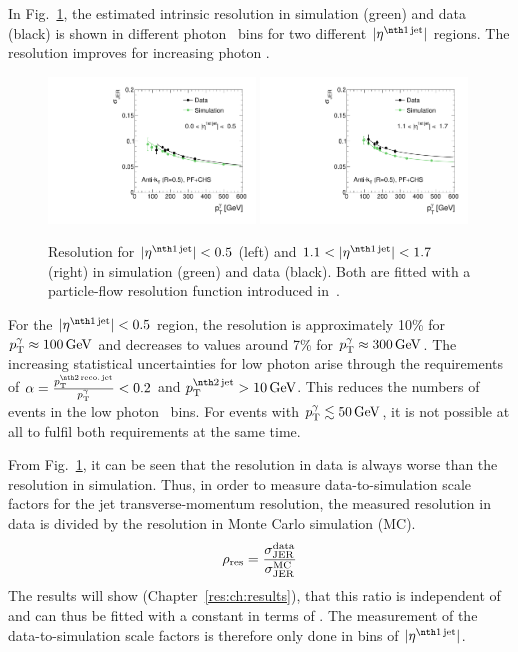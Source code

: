 In Fig.~\ref{fig:ResolutionOfPtgamma}, the estimated intrinsic resolution in simulation (green) and data (black) is shown in different photon \pt~bins for two different $|\etafirstjet|$ regions.
The resolution improves for increasing photon \pt. 
\begin{figure}[!b]
  \centering
    \includegraphics[width=0.49\textwidth]{figures/resolution/methodology/Resolution_for_1_eta_bin_PFCHS_mc_RMS99.pdf}
    \includegraphics[width=0.49\textwidth]{figures/resolution/methodology/Resolution_for_3_eta_bin_PFCHS_mc_RMS99.pdf}
  \caption{Resolution for $|\etafirstjet| < 0.5$ (left) and $1.1<|\etafirstjet| < 1.7$ (right) in simulation (green) and data (black). Both are fitted with a particle-flow resolution function introduced in~\cite{bib:CMS:JERCPaper_2011}.}  
  \label{fig:ResolutionOfPtgamma}
\end{figure}
For the $|\etafirstjet|<0.5$ region, the resolution is approximately 10\% for $p_{\text{T}}^{\gamma} \approx 100\,\text{Ge}\kern-0.06667em\text{V}$ and decreases to values around 7\% for $p_{\text{T}}^{\gamma} \approx 300\,\text{Ge}\kern-0.06667em\text{V}$.
The increasing statistical uncertainties for low photon \pt arise through the requirements of $\alpha=\frac{\ptsecondrecojet}{\ptgamma}<0.2$ and $\ptsecondjet>10\gev$. 
This reduces the numbers of events in the low photon \pt~bins. 
For events with ${p}_\mathrm{T}^{\gamma} \lesssim 50\,\text{Ge}\kern-0.06667em\text{V}$, it is not possible at all to fulfil both requirements at the same time.

From Fig.~\ref{fig:ResolutionOfPtgamma}, it can be seen that the resolution in data is always worse than the resolution in simulation.
Thus, in order to measure data-to-simulation scale factors \rhores for the jet transverse-momentum resolution, the measured resolution in data is divided by the resolution in Monte Carlo simulation (MC).
\begin{equation}
\label{res:eq:rhores}
\rho_\mathrm{res} = \frac{\sigma_\mathrm{JER}^{\text{data}}}{\sigma_\mathrm{JER}^{\text{MC}}}
\end{equation}
The results will show (Chapter~\ref{res:ch:results}), that this ratio is independent of \ptgamma and can thus be fitted with a constant in terms of \ptgamma.
The measurement of the data-to-simulation scale factors is therefore only done in bins of $|\etafirstjet|$.

